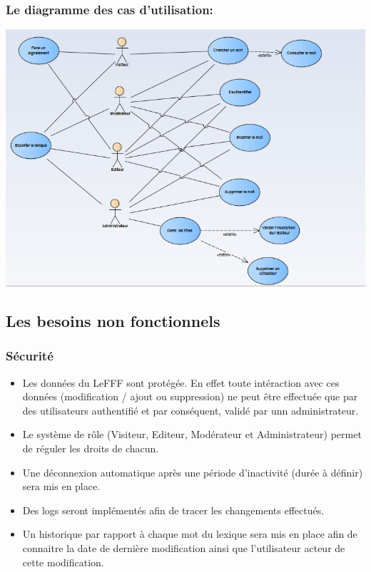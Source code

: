 \documentclass[12pt,a4paper]{article}
\begin{document}
\subsubsection{Le diagramme des cas d'utilisation:}
  \includegraphics[width=18cm]{img/Diagram_UseCase.PNG}

\subsection{Les besoins non fonctionnels}

\subsubsection{Sécurité}
\begin{itemize}
 \item Les données du LeFFF sont protégée. En effet toute intéraction avec ces données (modification / ajout ou suppression) ne peut être effectuée que par des utilisateurs authentifié et par conséquent, validé par unn administrateur.
 \item Le système de rôle (Visiteur, Editeur, Modérateur et Administrateur) permet de réguler les droits de chacun.
 \item Une déconnexion automatique après une période d'inactivité (durée à définir) sera mis en place.
 \item Des logs seront implémentés afin de tracer les changements effectués.
 \item Un historique par rapport à chaque mot du lexique sera mis en place afin de connaitre la date de dernière modification ainsi que l'utilisateur acteur de cette modification.
\end{itemize}
\end{document}
